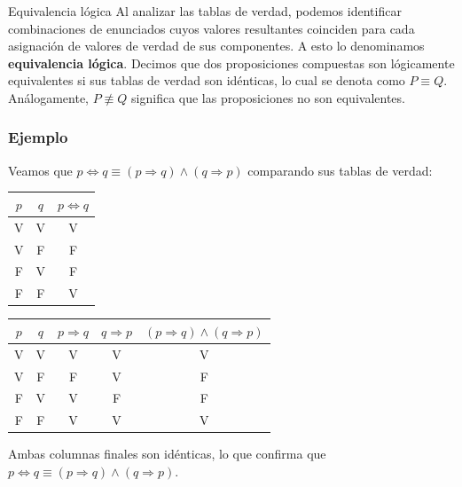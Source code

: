 \begin{dfn}{Equivalencia lógica}
    Al analizar las tablas de verdad, podemos identificar combinaciones de enunciados cuyos valores resultantes coinciden para cada asignación de valores de verdad de sus componentes. A esto lo denominamos \textbf{equivalencia lógica}. Decimos que dos proposiciones compuestas son lógicamente equivalentes si sus tablas de verdad son idénticas, lo cual se denota como $P \equiv Q$. Análogamente, $P \not\equiv Q$ significa que las proposiciones no son equivalentes.
\end{dfn}

\subsubsection*{Ejemplo}

Veamos que $p \Leftrightarrow q \equiv (p \Rightarrow q) \land (q \Rightarrow p)$ comparando sus tablas de verdad:

\begin{center}
    \renewcommand{\arraystretch}{1.4}
    \begin{tabular}{|c|c|c|}
        \hline
        \textbf{$p$} & \textbf{$q$} & \textbf{$p \Leftrightarrow q$} \\
        \hline
        V & V & V \\
        \hline
        V & F & F \\
        \hline
        F & V & F \\
        \hline
        F & F & V \\
        \hline
    \end{tabular}
    \qquad
    \renewcommand{\arraystretch}{1.4}
    \begin{tabular}{|c|c|c|c|c|}
        \hline
        \textbf{$p$} & \textbf{$q$} & \textbf{$p \Rightarrow q$} & \textbf{$q \Rightarrow p$} & \textbf{$(p \Rightarrow q) \land (q \Rightarrow p)$} \\
        \hline
        V & V & V & V & V \\
        \hline
        V & F & F & V & F \\
        \hline
        F & V & V & F & F \\
        \hline
        F & F & V & V & V \\
        \hline
    \end{tabular}
\end{center}

Ambas columnas finales son idénticas, lo que confirma que $p \Leftrightarrow q \equiv (p \Rightarrow q) \land (q \Rightarrow p)$.

